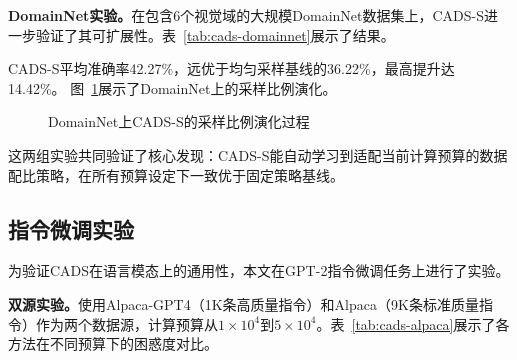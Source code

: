\textbf{DomainNet实验。}在包含6个视觉域的大规模DomainNet数据集上，CADS-S进一步验证了其可扩展性。表~\ref{tab:cads-domainnet}展示了结果。

\begin{table}[htb]
  \centering
  \caption{DomainNet上不同初始采样比例下各方法的准确率对比}
  \label{tab:cads-domainnet}
\end{table}

CADS-S平均准确率42.27\%，远优于均匀采样基线的36.22\%，最高提升达14.42\%。%
图~\ref{fig:cads-domainnet-ratio}展示了DomainNet上的采样比例演化。

\begin{figure}[htb]
  \centering
  \caption{DomainNet上CADS-S的采样比例演化过程}
  \label{fig:cads-domainnet-ratio}
\end{figure}

这两组实验共同验证了核心发现：CADS-S能自动学习到适配当前计算预算的数据配比策略，在所有预算设定下一致优于固定策略基线。

\subsection{指令微调实验}

为验证CADS在语言模态上的通用性，本文在GPT-2\cite{radford2019language}指令微调任务上进行了实验。

\textbf{双源实验。}使用Alpaca-GPT4\cite{peng2023instruction}（1K条高质量指令）和Alpaca\cite{alpaca}（9K条标准质量指令）作为两个数据源，计算预算从$1\times10^4$到$5\times10^4$。表~\ref{tab:cads-alpaca}展示了各方法在不同预算下的困惑度对比。

\begin{table}[htb]
  \centering
  \caption{GPT-2指令微调——不同计算预算下各方法的困惑度对比}
  \label{tab:cads-alpaca}
\end{table}


